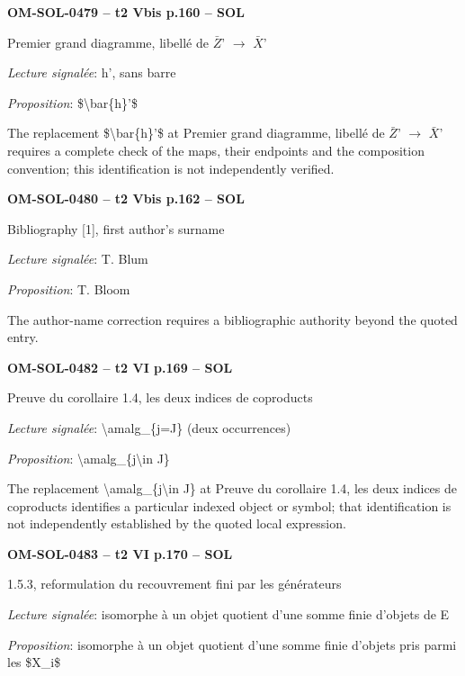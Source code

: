 \par\noindent\textbf{OM-SOL-0479 -- t2 Vbis p.160 -- SOL}\par
Premier grand diagramme, libellé de \ensuremath{\bar{Z}}' \ensuremath{\to} \ensuremath{\bar{X}}'\par
\emph{Lecture signalée}: h', sans barre\par
\emph{Proposition}: \$\textbackslash{}bar\{h\}'\$\par
The replacement \$\textbackslash{}bar\{h\}'\$ at Premier grand diagramme, libellé de \ensuremath{\bar{Z}}' \ensuremath{\to} \ensuremath{\bar{X}}' requires a complete check of the maps, their endpoints and the composition convention; this identification is not independently verified.\par
\par\noindent\textbf{OM-SOL-0480 -- t2 Vbis p.162 -- SOL}\par
Bibliography [1], first author's surname\par
\emph{Lecture signalée}: T. Blum\par
\emph{Proposition}: T. Bloom\par
The author-name correction requires a bibliographic authority beyond the quoted entry.\par
\par\noindent\textbf{OM-SOL-0482 -- t2 VI p.169 -- SOL}\par
Preuve du corollaire 1.4, les deux indices de coproducts\par
\emph{Lecture signalée}: \textbackslash{}amalg\_\{j=\allowbreak J\} (deux occurrences)\par
\emph{Proposition}: \textbackslash{}amalg\_\{j\textbackslash{}in J\}\par
The replacement \textbackslash{}amalg\_\{j\textbackslash{}in J\} at Preuve du corollaire 1.4, les deux indices de coproducts identifies a particular indexed object or symbol; that identification is not independently established by the quoted local expression.\par
\par\noindent\textbf{OM-SOL-0483 -- t2 VI p.170 -- SOL}\par
1.5.3, reformulation du recouvrement fini par les générateurs\par
\emph{Lecture signalée}: isomorphe à un objet quotient d'une somme finie d'objets de E\par
\emph{Proposition}: isomorphe à un objet quotient d'une somme finie d'objets pris parmi les \$X\_i\$\par
